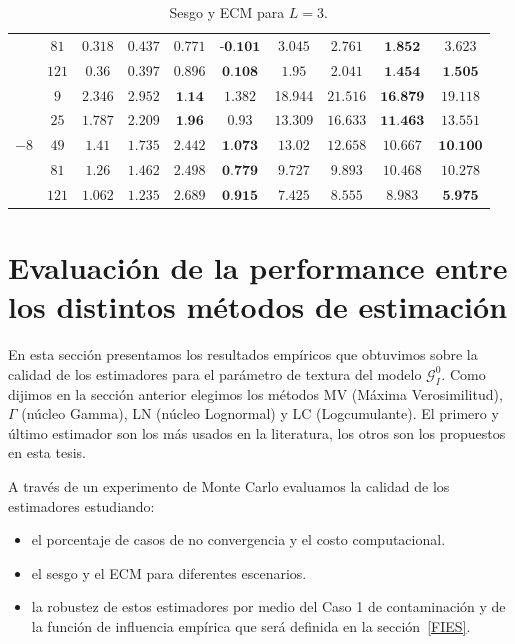 \begin{table}[hbt]
\begin{tabular}{cc|cccc|cccc}
		& $81$	& $0.318$	& $0.437$	& $0.771$	 			 & $\textbf{-0.101}$	& $3.045$	    & $2.761$	    & $\textbf{1.852}$	 & $3.623$ \\ 
		& $121$	& $0.36$	& $0.397$	& $0.896$	 			 & $\textbf{0.108}$	    & $1.95$	    & $2.041$	    & $\textbf{1.454}$	 & $\textbf{1.505}$ \\ 
		\cmidrule(r){1-6}
		\cmidrule(r){7-10}									
		\multirow{5 }{*}{$-8$}									
		& $9$	& $2.346$	& $2.952$   & $\textbf{1.14}$     	& $1.382$				& 18.944		& $21.516$	& $\textbf{16.879}$	 & $19.118$ \\ 
		& $25$	& $1.787$	& $2.209$	& $\textbf{1.96}$		& $0.93$				& $13.309$	 	& $16.633$	& $\textbf{11.463}$	 & $13.551$ \\ 
		& $49$	& $1.41$	& $1.735$	& $2.442$				& $\textbf{1.073}$		& $13.02$	    & $12.658$  & $10.667$	         & $\textbf{10.100}$ \\ 
		& $81$	& $1.26$	& $1.462$	& $2.498$				& $\textbf{0.779}$		& $9.727$	    & $9.893$	& $10.468$	 		 & $10.278$  \\ 
		& $121$	& $1.062$	& $1.235$	& $2.689$				& $\textbf{0.915}$		& $7.425$	    & $8.555$	& $8.983$	         & $\textbf{5.975}$  \\ 
 		\bottomrule 								
	\end{tabular}										
	\caption{\label{SesgoyECMSinContConConstL=3} Sesgo y ECM para $L=3$.}									
\end{table}										


\section{Evaluación de la performance entre los distintos métodos de estimación}

En esta sección presentamos los resultados empíricos que obtuvimos sobre la calidad de los estimadores para el parámetro de textura del modelo $\mathcal G_I^0$. Como dijimos en la sección anterior elegimos los métodos MV (Máxima Verosimilitud), $\Gamma$ (núcleo Gamma), LN (núcleo Lognormal) y LC (Logcumulante). El primero y último estimador son los más usados en la literatura, los otros son los propuestos en esta tesis.

A través de un experimento de Monte Carlo evaluamos la calidad de los estimadores estudiando:
\begin{itemize}
	\item el porcentaje de casos de no convergencia y el costo computacional.
	\item el sesgo y el ECM para diferentes escenarios.
	\item la robustez de estos estimadores por medio del Caso 1 de contaminación y de la función de influencia empírica que será definida en la sección~\ref{FIES}.
\end{itemize} 

